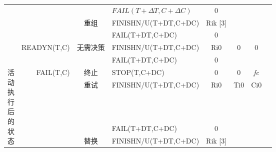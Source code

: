 \begin{table}[htbp]
\begin{tabular}{rrrrrrrr}
        \multicolumn{1}{c|}{} 
        &       
        & \multicolumn{1}{|c}{} 
        & \multicolumn{1}{|l}{$FAIL(T+\Delta T,C+\Delta C)$} 
        & \multicolumn{1}{|c}{0} 
        & \multicolumn{1}{|c}{} 
        & \multicolumn{1}{|c}{} \\
        \cline{3-7}

        \multicolumn{1}{c|}{} 
        &       
        & \multicolumn{1}{|c}{\multirow{2}{*}{重组}} 
        & \multicolumn{1}{|l}{FINISHN/U(T+DT,C+DC)} 
        & \multicolumn{1}{|c}{Rik  [3]} 
        & \multirow{2}{*}{} 
        & \multicolumn{1}{|c}{\multirow{2}{*}{}} \\
        
        \multicolumn{1}{c}{} &       & \multicolumn{1}{c}{} & \multicolumn{1}{l}{FAIL(T+DT,C+DC)} & \multicolumn{1}{c}{0} &       & \multicolumn{1}{c}{} \\
        \multicolumn{1}{c}{} & \multirow{2}[4]{*}{READYN(T,C)} & \multicolumn{1}{c}{\multirow{2}[4]{*}{无需决策}} & \multicolumn{1}{l}{FINISHN/U(T+DT,C+DC)} & \multicolumn{1}{c}{Ri0} & \multicolumn{1}{c}{\multirow{2}[4]{*}{0}} & \multicolumn{1}{c}{\multirow{2}[4]{*}{0}} \\
        \multicolumn{1}{c}{} &       & \multicolumn{1}{c}{} & \multicolumn{1}{l}{FAIL(T+DT,C+DC)} & \multicolumn{1}{c}{0} & \multicolumn{1}{c}{} & \multicolumn{1}{c}{} \\
        \multicolumn{1}{c}{\multirow{11}[22]{*}{\parbox{1em}{活\\动\\执\\行\\后\\的\\状\\态}}} & \multirow{7}[14]{*}{FAIL(T,C)} & \multicolumn{1}{c}{终止} & \multicolumn{1}{l}{STOP(T,C+DC)} & \multicolumn{1}{c}{0} & \multicolumn{1}{c}{0} & \multicolumn{1}{c}{\textit{fc}} \\
        \multicolumn{1}{c}{} &       & \multicolumn{1}{c}{\multirow{2}[4]{*}{重试}} & \multicolumn{1}{l}{FINISHN/U(T+DT,C+DC)} & \multicolumn{1}{c}{Ri0} & \multicolumn{1}{c}{\multirow{2}[4]{*}{Ti0}} & \multicolumn{1}{c}{\multirow{2}[4]{*}{Ci0}} \\
        \multicolumn{1}{c}{} &       & \multicolumn{1}{c}{} & \multicolumn{1}{l}{FAIL(T+DT,C+DC)} & \multicolumn{1}{c}{0} & \multicolumn{1}{c}{} & \multicolumn{1}{c}{} \\
        \multicolumn{1}{c}{} &       & \multicolumn{1}{c}{\multirow{2}[4]{*}{替换}} & \multicolumn{1}{l}{FINISHN/U(T+DT,C+DC)} & \multicolumn{1}{c}{Rik  [3]} & \multicolumn{1}{c}{\multirow{2}[4]{*}{\textit{}}} & \multicolumn{1}{c}{\multirow{2}[4]{*}{\textit{}}} \\

\end{tabular}
\end{table}
